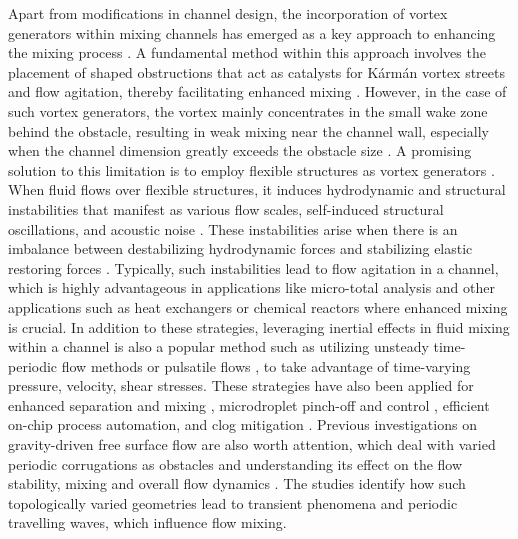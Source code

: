 \documentclass[%
aip,
amsmath,amssymb,
reprint,
]{revtex4-1}
\begin{document}
	Apart from modifications in channel design, the incorporation of vortex generators within mixing channels has emerged as a key approach to enhancing the mixing process \citep{Ali2015,Khatavkar2007,Dadvand2019,Ali2016,Hsiao2014,Hosseini2021,Van_Loon2007,Eizadi2022}. A fundamental method within this approach involves the placement of shaped obstructions that act as catalysts for Kármán vortex streets and flow agitation, thereby facilitating enhanced mixing \citep{Abdelhamid2021,Yadav2021,Jing2022,Yu2017}. However, in the case of such vortex generators, the vortex mainly concentrates in the small wake zone behind the obstacle, resulting in weak mixing near the channel wall, especially when the channel dimension greatly exceeds the obstacle size \citep{Wang2020}. A promising solution to this limitation is to employ flexible structures as vortex generators \citep{Chen2020,Park2019,Saleh2019,Zhao2020,Pfister2020}. When fluid flows over flexible structures, it induces hydrodynamic and structural instabilities that manifest as various flow scales, self-induced structural oscillations, and acoustic noise \citep{Balachandar1999, Zhang2000, Mahadevan2004, Vandenberghe2004, Shelley2011}. These instabilities arise when there is an imbalance between destabilizing hydrodynamic forces and stabilizing elastic restoring forces \citep{Taneda1968, Zhang2000, Watanabe2002, Eloy2008, ZhuPeskin2002, Alben2008}. Typically, such instabilities lead to flow agitation in a channel, which is highly advantageous in applications like micro-total analysis \citep{Manz2002} and other applications such as heat exchangers or chemical reactors where enhanced mixing is crucial. In addition to these strategies, leveraging inertial effects in fluid mixing within a channel is also a popular method \citep{Carlo2009,Carlo2007} such as utilizing unsteady time-periodic flow methods or pulsatile flows \citep{Cai2017}, to take advantage of time-varying pressure, velocity, shear stresses. These strategies have also been applied for enhanced separation and mixing \citep{Ward2015}, microdroplet pinch-off and control \citep{Zhu2017, SENAPATI2019}, efficient on-chip process automation, and clog mitigation \citep{Mehendale2018}. Previous investigations on gravity-driven free surface flow are also worth attention, which deal with varied periodic corrugations as obstacles and understanding its effect on the flow stability, mixing and overall flow dynamics \cite{Aksel2012,Aksel2018,Aksel2020, Kuehner2021,Kuehner2022}. The studies identify how such topologically varied geometries lead to transient phenomena and periodic travelling waves, which influence flow mixing. 
	
\end{document}

